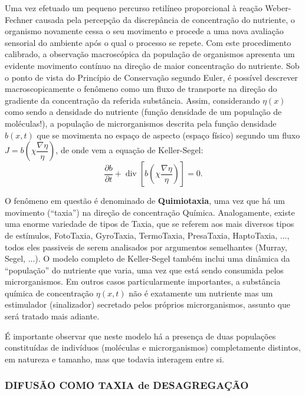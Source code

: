 Uma vez efetuado um pequeno percurso retilíneo proporcional à reação Weber-Fechner causada pela percepção da discrepância de concentração do nutriente, o organismo novamente cessa o seu movimento e procede a uma nova avaliação sensorial do ambiente após o qual o processo se repete. Com este procedimento calibrado, a observação macroscópica da população de organismos apresenta um evidente movimento contínuo na direção de maior concentração do nutriente. Sob o ponto de vista do Princípio de Conservação segundo Euler, é possível descrever macroscopicamente o fenômeno como um fluxo de transporte na direção do gradiente da concentração da referida substância. Assim, considerando \(\eta(x)\) como sendo a densidade do nutriente (função densidade de um população de moléculas!), a população de microrganismos descrita pela função densidade \(b(x,t)\) que se movimenta no espaço de aspecto (espaço físico) segundo um fluxo \(J = b\left(\chi \dfrac{\nabla\eta}{\eta}\right)\), de onde vem a equação de Keller-Segel:
\begin{equation}
\dfrac{\partial b}{\partial t} + \operatorname{div}\left[b\left(\chi \dfrac{\nabla\eta}{\eta}\right)\right] = 0.
\end{equation}


O fenômeno em questão é denominado de \textbf{Quimiotaxia}, uma vez que há um movimento (``taxia'') na direção de concentração Química. Analogamente, existe uma enorme variedade de tipos de Taxia, que se referem aos mais diversos tipos de estímulos, FotoTaxia, GyroTaxia, TermoTaxia, PresaTaxia, HaptoTaxia, ..., todos eles passiveis de serem analisados por argumentos semelhantes (Murray, Segel, ...). O modelo completo de Keller-Segel também inclui uma dinâmica da ``população'' do nutriente que varia, uma vez que está sendo consumida pelos microrganismos. Em outros casos particularmente importantes, a substância química de concentração \(\eta(x,t)\) não é exatamente um nutriente mas um estimulador (sinalizador) secretado pelos próprios microrganismos, assunto que será tratado mais adiante.

É importante observar que neste modelo há a presença de duas populações constituídas de indivíduos (moléculas e microrganismos) completamente distintos, em natureza e tamanho, mas que todavia interagem entre si.

\subsubsection{DIFUSÃO COMO TAXIA de DESAGREGAÇÃO}

